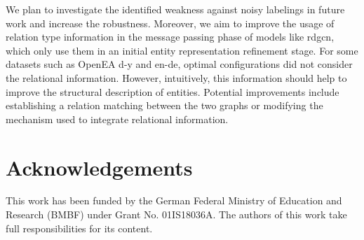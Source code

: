 \documentclass[runningheads]{llncs}
\begin{document}
We plan to investigate the identified weakness against noisy labelings in future work and increase the robustness.
Moreover, we aim to improve the usage of relation type information in the message passing phase of models like \acrshort{rdgcn}, which only use them in an initial entity representation refinement stage. For some datasets such as OpenEA d-y and en-de, optimal configurations did not consider the relational information. However, intuitively, this information should help to improve the structural description of entities. Potential improvements include establishing a relation matching between the two graphs or modifying the mechanism used to integrate relational information. 

\section*{Acknowledgements}
This work has been funded by the German Federal Ministry of Education and Research (BMBF) under Grant No. 01IS18036A. The authors of this work take full responsibilities for its content.



\end{document}
